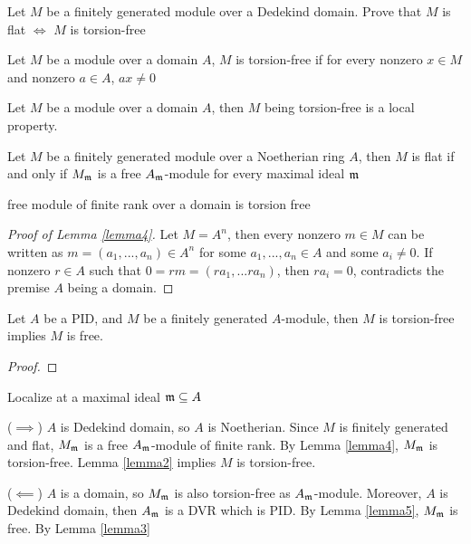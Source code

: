 \begin{problem}
	Let $M$ be a finitely generated module over a Dedekind domain. Prove that $M$ is flat $\iff$ $M$ is torsion-free
\end{problem}

\begin{definition}
	Let $M$ be a module over a domain $A$, $M$ is torsion-free if for every nonzero $x \in M$ and nonzero $a \in A$, $ax \neq 0$
\end{definition}

\begin{lemma}
	\label{lemma2}
	Let $M$ be a module over a domain $A$, then $M$ being torsion-free is a local property. 
\end{lemma}

\begin{lemma}
	\label{lemma3}
	Let $M$ be a finitely generated module over a Noetherian ring $A$, then $M$ is flat if and only if $M_{\mathfrak{m}}$ is a free $A_{\mathfrak{m}}$-module for every maximal ideal $\mathfrak{m}$
\end{lemma}

\begin{lemma}
	\label{lemma4}
	free module of finite rank over a domain is torsion free
\end{lemma}

\begin{proof}[Proof of Lemma \ref{lemma4}]
	Let $M = A^n$, then every nonzero $m \in M$ can be written as $m = (a_1, ..., a_n) \in A^n$ for some $a_1, ..., a_n \in A$ and some $a_i \neq 0$. If nonzero $r \in A$ such that $0 = rm = (r a_1, ... r a_n)$, then  $r a_i = 0$, contradicts the premise $A$ being a domain.
\end{proof}

\begin{lemma}
	\label{lemma5}
	Let $A$ be a PID, and $M$ be a finitely generated $A$-module, then $M$ is torsion-free implies $M$ is free.
\end{lemma}

\begin{proof}
\end{proof}

\begin{longproof}
	Localize at a maximal ideal $\mathfrak{m} \subseteq A$
	
	($\implies$) $A$ is Dedekind domain, so $A$ is Noetherian. Since $M$ is finitely generated and flat, $M_{\mathfrak{m}}$ is a free $A_{\mathfrak{m}}$-module of finite rank. By Lemma \ref{lemma4}, $M_{\mathfrak{m}}$ is torsion-free. Lemma \ref{lemma2} implies $M$ is torsion-free.
	
	($\impliedby$) $A$ is a domain, so $M_{\mathfrak{m}}$ is also torsion-free as $A_{\mathfrak{m}}$-module. Moreover, $A$ is Dedekind domain, then $A_{\mathfrak{m}}$ is a DVR which is PID. By Lemma \ref{lemma5}, $M_{\mathfrak{m}}$ is free. By Lemma \ref{lemma3}
		
\end{longproof}


